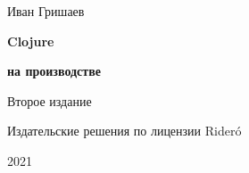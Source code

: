
\begin{titlepage}

\begin{center}

  {Иван Гришаев}

  \vspace*{5cm}

  {\Huge\textbf{Clojure}}

  \vspace{1mm}

  {\Large\textbf{на производстве}}

  \vspace{7mm}

  {\Large Второе издание}

  \vspace*{\fill}

  \ifridero
  {Издательские решения по лицензии Rider\'{o}}
  \fi

  {2021}

\end{center}

\end{titlepage}
